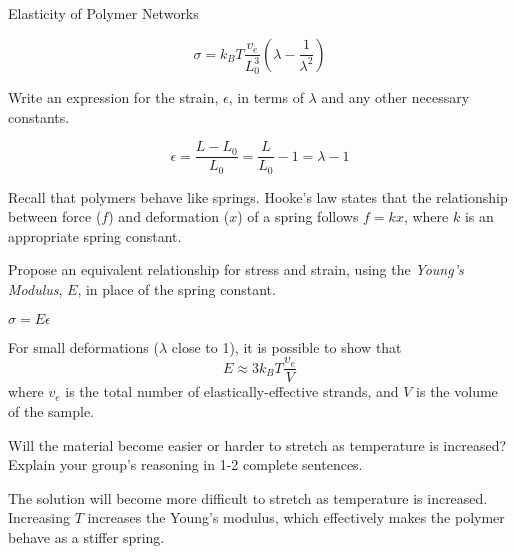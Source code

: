 \begin{activity}{Elasticity of Polymer Networks}
\begin{ctqs}
		\begin{solution}[0.8in]{}
			\begin{equation*}
				\sigma = k_BT\frac{v_e}{L_0^3}\left(\lambda - \frac{1}{\lambda^2}\right)
			\end{equation*}
		\end{solution}

	\question Write an expression for the strain, $\epsilon$, in terms of $\lambda$ and any other necessary constants.
	
		\begin{solution}[0.8in]{}
			\begin{equation*}
				\epsilon = \frac{L-L_0}{L_0} = \frac{L}{L_0} -1 = \lambda - 1
			\end{equation*}
		\end{solution}
		
	\question Recall that polymers behave like springs.  Hooke's law states that the relationship between force ($f$) and deformation ($x$) of a spring follows $f=kx$, where $k$ is an appropriate spring constant.
	
		Propose an equivalent relationship for stress and strain, using the \emph{Young's Modulus}, $E$, in place of the spring constant.
		
		\label{\labelbase:ctq:sigmaEeps}
		
			\begin{solution}[0.5in]{}
			
				$\sigma = E\epsilon$
				
			\end{solution}
	
\end{ctqs}

\begin{infobox}
	For small deformations ($\lambda$ close to 1), it is possible to show that
	\begin{equation*}
		E \approx 3k_BT\frac{v_e}{V}
		\label{\labelbase:eqn:youngsmodulus}
	\end{equation*}
	where $v_e$ is the total number of elastically-effective strands, and $V$ is the volume of the sample.
\end{infobox}

\begin{ctqs}
	\question Will the material become easier or harder to stretch as temperature is increased?  Explain your group's reasoning in 1-2 complete sentences.
	
		\begin{solution}[1.5in]{}
			The solution will become more difficult to stretch as temperature is increased.  Increasing $T$ increases the Young's modulus, which effectively makes the polymer behave as a stiffer spring.
		\end{solution}
	

\end{ctqs}
\end{activity}
